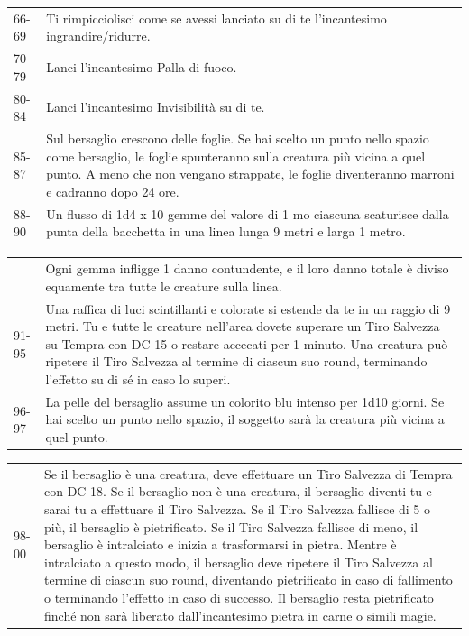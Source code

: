 \begin{multicols}{2}
\begin{tabularx}{\linewidth}{lX}
\rowcolor{gray!20}66-69 &Ti rimpicciolisci come se avessi lanciato su di te l'incantesimo ingrandire/ridurre.\\
70-79 &Lanci l'incantesimo Palla di fuoco.\\
\rowcolor{gray!20}80-84 &Lanci l'incantesimo Invisibilità su di te.\\
85-87 &Sul bersaglio crescono delle foglie. Se hai scelto un punto nello spazio come bersaglio, le foglie spunteranno sulla creatura più vicina a quel punto. A meno che non vengano strappate, le foglie diventeranno marroni e cadranno dopo 24 ore.\\
\rowcolor{gray!20}88-90& Un flusso di 1d4 x 10 gemme del valore di 1 mo ciascuna scaturisce dalla punta della bacchetta in una linea lunga 9 metri e larga 1 metro.\\
\end{tabularx}
\noindent\begin{tabularx}{\linewidth}{lX}
\rowcolor{gray!20}& Ogni gemma infligge 1 danno contundente, e il loro danno totale è diviso equamente tra tutte le creature sulla linea.\\
91-95 &Una raffica di luci scintillanti e colorate si estende da te in un raggio di 9 metri. Tu e tutte le creature nell'area dovete superare un Tiro Salvezza su Tempra con DC 15 o restare accecati per 1 minuto. Una creatura può ripetere il Tiro Salvezza al termine di ciascun suo round, terminando l'effetto su di sé in caso lo superi.\\
\rowcolor{gray!20}96-97 &La pelle del bersaglio assume un colorito blu intenso per 1d10 giorni. Se hai scelto un punto nello spazio, il soggetto sarà la creatura più vicina a quel punto.\\
\end{tabularx}
\noindent\begin{tabularx}{\linewidth}{lX}
\rowcolor{gray!20}98-00 &Se il bersaglio è una creatura, deve effettuare un Tiro Salvezza di Tempra con DC 18. Se il bersaglio non è una creatura, il bersaglio diventi tu e sarai tu a effettuare il Tiro Salvezza. Se il Tiro Salvezza fallisce di 5 o più, il bersaglio è pietrificato. Se il Tiro Salvezza fallisce di meno, il bersaglio è intralciato e inizia a trasformarsi in pietra. Mentre è intralciato a questo modo, il bersaglio deve ripetere il Tiro Salvezza al termine di ciascun suo round, diventando pietrificato in caso di fallimento o terminando l'effetto in caso di successo. Il bersaglio resta pietrificato finché non sarà liberato dall'incantesimo pietra in carne o simili magie.\\
\end{tabularx}


\end{multicols}
